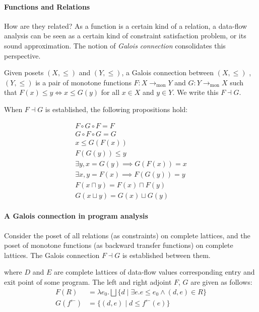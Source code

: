 \documentclass{llncs}
\newcommand{\Pow}{\mathcal{P}}
\newcommand{\Rel}{\mathrm{Rel}}
\newcommand{\Unidir}{\mathrm{Bwd}}
\newcommand{\tomon}{\to_{\mathrm{mon}}}
\newcommand{\fb}{{f^{\leftarrow}}}
\newcommand{\join}{\sqcup}
\newcommand{\bigjoin}{\bigsqcup}
\newcommand{\meet}{\sqcap}
\newcommand{\comp}{\circ}
\begin{document}
  \paragraph{Functions and Relations}
  How are they related?
    As a function is a certain kind of a relation,
    a data-flow analysis can be seen as a certain kind of constraint satisfaction problem, or its sound approximation.
    The notion of \emph{Galois connection} consolidates this perspective.
  
  \begin{definition}
    Given posets $(X, \leq)$ and $(Y, \leq)$, a Galois connection between $(X, \leq)$ , $(Y, \leq)$ is a pair of monotone functions $F : X \tomon Y$ and $G : Y \tomon X$ such that $F(x) \leq y \iff x \leq G(y)$ for all $x \in X$ and $y \in Y$.
    We write this $F \dashv G$.
  \end{definition}

  When $F \dashv G$ is established, the following propositions hold:

  \begin{align}
    F \comp G \comp F = F \\
    G \comp F \comp G = G \\
    x \leq G(F(x)) \\
    F(G(y)) \leq y \\
    \exists y, x = G(y) \implies G(F(x)) = x \\
    \exists x, y = F(x) \implies F(G(y)) = y \\
    F (x \meet y) = F(x) \meet F(y) \\
    G (x \join y) = G(x) \join G (y)
  \end{align}

 \paragraph{A Galois connection in program analysis}

    Consider the poset of all relations (as constraints) on complete lattices, and the poset of monotone functions (as backward transfer functions) on complete lattices.
    The Galois connection $F \dashv G$ is established between them.
  \begin{center}
  \end{center}
  where $D$ and $E$ are complete lattices of data-flow values corresponding entry and exit point of some program. The left and right adjoint $F$, $G$ are given as follows:
  \begin{align*}
    F(R) &= \lambda e_{0} . \bigjoin \{ d \mid \exists e. e \leq e_{0}  \land (d , e) \in R \} \\
    G(\fb) &= \{ (d , e) \mid d \leq \fb(e) \} \\
  \end{align*}
\end{document}
